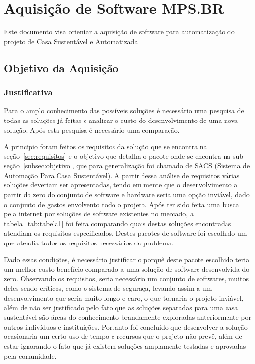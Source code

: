 \chapter{Aquisição de Software MPS.BR}

\begin{center}
	Este documento visa orientar a aquisição de software para automatização do projeto de Casa Sustentável e Automatizada
	\end{center}

\section{Objetivo da Aquisição}

\subsection{Justificativa}

	Para o amplo conhecimento das possíveis soluções é necessário uma pesquisa de todas as soluções já feitas e analizar
	 o custo do desenvolvimento de uma nova solução. Após esta pesquisa é necessário uma comparação.

	A princípio foram feitos os requisitos da solução que se encontra na seção~\ref{sec:requisitos} e o objetivo que
	detalha o pacote onde se encontra na sub-seção~\ref{subsec:objetivo}, que para generalização foi chamado de SACS (Sistema de Automação Para Casa Sustentável). A
	partir dessa análise de requisitos várias soluções deveriam ser apresentadas, tendo em mente que o desenvolvimento
	a partir do zero do conjunto de software e hardware seria uma opção inviável, dado o conjunto de gastos envolvento
	todo o projeto. Após ter sido feita uma busca pela internet por soluções de software existentes no
	mercado, a tabela~\ref{tab:tabela1} foi feita comparando quais destas soluções encontradas atendiam os requisitos especificados.
	Destes pacotes de software foi escolhido um que atendia todos os requisitos necessários do problema.

	Dado essas condições, é necessário justificar o porquê deste pacote escolhido teria um melhor custo-benefício
	comparado a uma solução de software desenvolvida do zero. Observando os requisitos, seria necessário um conjunto
	de softwares, muitos deles sendo críticos, como o sistema de seguraça, levando assim a um desenvolvimento
	 que seria muito longo e caro, o que tornaria o projeto inviável, além de não ser justificado pelo fato que as
	 soluções separadas para uma casa sustentável são áreas do conhecimento brandamente exploradas anteriormente por
	 outros indivíduos e instituições. Portanto foi concluido que desenvolver a solução ocasionaria um certo uso de
	 tempo e recursos que o projeto não prevê, além de estar ignorando o fato que já existem soluções amplamente
	 testadas e aprovadas pela comunidade.


